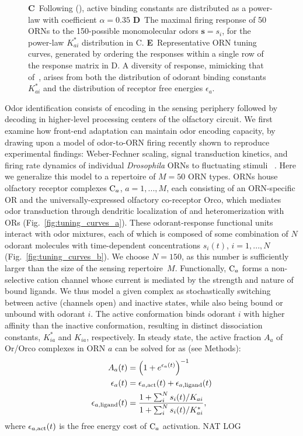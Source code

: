 \documentclass[9pt,twocolumn,twoside,lineno]{pnas-new}
\begin{document}
\begin{figure}[!tb]
{{			\textbf{C}~Following (), active binding constants are distributed as a power-law with coefficient $\alpha=0.35$
			\textbf{D}~The maximal firing response of 50 ORNs to the 150-possible monomolecular odors $\mathbf s = s_i$, for the power-law $K^*_{ai}$ distribution in C.
			\textbf{E}~Representative ORN tuning curves, generated by ordering the responses within a single row of the response matrix in D. A diversity of response, mimicking that of~\cite{hallem_carlson}, arises from both the distribution of odorant binding constants $K^*_{ai}$ and the distribution of receptor free energies $\epsilon_a$.}}
	\label{fig:tuning_curves}
\end{figure}

Odor identification consists of encoding in the sensing periphery followed by decoding in higher-level processing centers of the olfactory circuit. We first examine how front-end adaptation can maintain odor encoding capacity,  by  drawing upon a model of odor-to-ORN firing recently shown to reproduce experimental findings: Weber-Fechner scaling, signal transduction kinetics, and firing rate dynamics of individual \textit{Drosophila} ORNs to fluctuating stimuli ~\cite{srinivas_elife}. Here we generalize this model to a repertoire of $M=50$ ORN types. ORNs house olfactory receptor complexes $\textup{C}_a$, $a=1,...,M$, each consisting of an ORN-specific OR and the universally-expressed olfactory co-receptor Orco, which mediates odor transduction through dendritic localization of and heteromerization with ORs (Fig.~\ref{fig:tuning_curves_a}). These odorant-response functional units interact with odor mixtures, each of which is composed of some combination of $N$ odorant molecules with time-dependent concentrations $s_i(t)$, $i=1,...,N$ (Fig.~\ref{fig:tuning_curves_b}). We choose $N=150$, as this number is sufficiently larger than the size of the sensing repertoire~$M$. Functionally, $\textup{C}_a$ forms a non-selective cation channel whose current is mediated by the strength and nature of bound ligands. We thus model a given complex as stochastically switching between active (channels open) and inactive states, while also being bound or unbound with odorant $i$. The active conformation binds odorant $i$ with higher affinity than the inactive conformation, resulting in distinct dissociation constants, $K^*_{ia}$ and $K_{ia}$, respectively. In steady state, the active fraction $A_a$ of Or/Orco complexes in ORN $a$ can be solved for as (see Methods):
\begin{align}
A_a(t) &= \left(1 + e^{\epsilon_a(t)}\right)^{-1} \nonumber \\
\epsilon_a(t) &= \epsilon_{a, \textup{act}}(t) + \epsilon_{a, \textup{ligand}}(t) \nonumber \\
\epsilon_{a, \textup{ligand}}(t) &= \frac{1 + \sum_i^N s_i(t)/K_{ai}}{1 + \sum_i^N s_i(t)/K^*_{ai}},
\label{eq:steady_state_act_OR}
\end{align}
where $\epsilon_{a, \textup{act}}(t)$ is the free energy cost of $\textup{C}_a$ activation. NAT LOG
\end{document}
